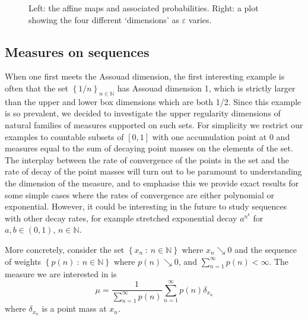 \documentclass[12pt]{amsart}
\numberwithin{equation}{section}
\renewcommand{\epsilon}{\varepsilon}
\begin{document}
\begin{figure}[H]
\begin{minipage}{.5\textwidth}

\end{minipage}

  \caption{Left: the affine maps and associated probabilities.  Right: a plot showing the four different `dimensions' as $\epsilon$ varies.}
  \label{fig:badcarpet}
\end{figure}




\subsection{Measures on sequences}

When one first meets the Assouad dimension, the first interesting example is often that the set $\left\{1/n \right\}_{n\in \mathbb{N}}$ has Assouad dimension 1, which is strictly larger than the upper and lower box dimensions which are both 1/2.  Since this example is so prevalent, we decided to investigate the upper regularity dimensions of natural families of measures supported on such sets. For simplicity we restrict our examples to countable subsets of $[0,1]$ with one accumulation point at 0 and measures equal to the sum of decaying point masses on the elements of the set. The interplay between the rate of convergence of the points in the set and the rate of decay of the point masses will turn out to be paramount to understanding the dimension of the measure, and to emphasise this we provide exact results for some simple cases where the rates of convergence are either polynomial or exponential.  However, it could be interesting in the future to study  sequences with other decay rates, for example  stretched exponential decay $a^{n^b}$ for $a,b \in (0,1)$, $n \in \mathbb{N}$.

More concretely, consider the set $\left\{ x_n \ : \ n \in \mathbb{N}\right\}$ where  $x_n  \searrow 0$ and the sequence of weights $\left\{ p(n) \ : \ n \in \mathbb{N} \right\}$ where $p(n) \searrow 0$, and $\sum_{n=1}^\infty p(n) < \infty$.  The measure we are interested in is
\[
\mu = \frac{1}{\sum_{n=1}^\infty p(n) } \sum_{n=1}^\infty p(n)\delta_{x_n} 
\]
where $\delta_{x_n} $ is a point mass at $x_n$.
\end{document}
